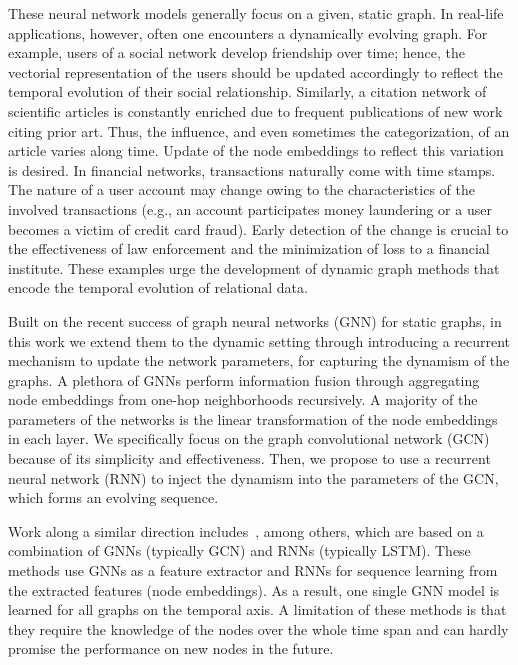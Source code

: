 \documentclass[letterpaper]{article} %
\begin{document}
These neural network models generally focus on a given, static graph. In real-life applications, however, often one encounters a dynamically evolving graph. For example, users of a social network develop friendship over time; hence, the vectorial representation of the users should be updated accordingly to reflect the temporal evolution of their social relationship. Similarly, a citation network of scientific articles is constantly enriched due to frequent publications of new work citing prior art. Thus, the influence, and even sometimes the categorization, of an article varies along time. Update of the node embeddings to reflect this variation is desired. In financial networks, transactions naturally come with time stamps. The nature of a user account may change owing to the characteristics of the involved transactions (e.g., an account participates money laundering or a user becomes a victim of credit card fraud). Early detection of the change is crucial to the effectiveness of law enforcement and the minimization of loss to a financial institute. These examples urge the development of dynamic graph methods that encode the temporal evolution of relational data.

Built on the recent success of graph neural networks (GNN) for static graphs, in this work we extend them to the dynamic setting through introducing a recurrent mechanism to update the network parameters, for capturing the dynamism of the graphs. A plethora of GNNs perform information fusion through aggregating node embeddings from one-hop neighborhoods recursively. A majority of the parameters of the networks is the linear transformation of the node embeddings in each layer. We specifically focus on the graph convolutional network (GCN)~\cite{Kipf2017} because of its simplicity and effectiveness. Then, we propose to use a recurrent neural network (RNN) to inject the dynamism into the parameters of the GCN, which forms an evolving sequence.

Work along a similar direction includes~\cite{Seo2016,Manessia2017,Narayan2018}, among others, which are based on a combination of GNNs (typically GCN) and RNNs (typically LSTM). These methods use GNNs as a feature extractor and RNNs for sequence learning from the extracted features (node embeddings). As a result, one single GNN model is learned for all graphs on the temporal axis. A limitation of these methods is that they require the knowledge of the nodes over the whole time span and can hardly promise the performance on new nodes in the future.
\end{document}
